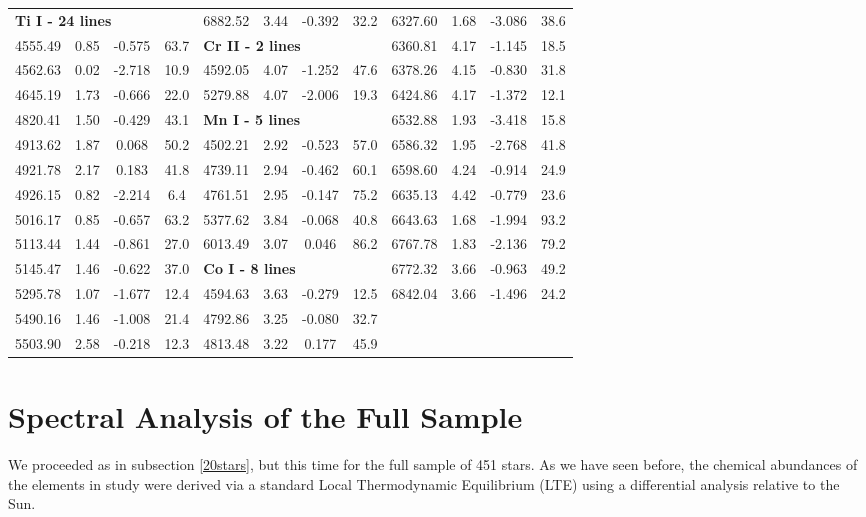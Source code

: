 \documentclass[dvips,12pt,a4paper]{report}
\begin{document}
{{\begin{table}[h!]
\begin{tabular}{c c c c | c c c c | c c c c}
\multicolumn{3}{l}{\textbf{Ti I - 24 lines}} & & 6882.52 & 3.44 & -0.392 &  32.2 & 6327.60 & 1.68 & -3.086 &  38.6 \\
4555.49 & 0.85 & -0.575 &  63.7 & \multicolumn{3}{l}{\textbf{Cr II - 2 lines}} &  & 6360.81 & 4.17 & -1.145 &  18.5 \\
4562.63 & 0.02 & -2.718 &  10.9 & 4592.05 & 4.07 & -1.252 &  47.6 & 6378.26 & 4.15 & -0.830 &  31.8 \\
4645.19 & 1.73 & -0.666 &  22.0 & 5279.88 & 4.07 & -2.006 &  19.3 & 6424.86 & 4.17 & -1.372 &  12.1 \\
4820.41 & 1.50 & -0.429 &  43.1 & \multicolumn{3}{l}{\textbf{Mn I - 5 lines}}  &  & 6532.88 & 1.93 & -3.418 &  15.8 \\
4913.62 & 1.87 &  0.068 &  50.2 & 4502.21 & 2.92 & -0.523 &  57.0 & 6586.32 & 1.95 & -2.768 &  41.8 \\
4921.78 & 2.17 &  0.183 &  41.8 & 4739.11 & 2.94 & -0.462 &  60.1 & 6598.60 & 4.24 & -0.914 &  24.9 \\
4926.15 & 0.82 & -2.214 &   6.4 & 4761.51 & 2.95 & -0.147 &  75.2 & 6635.13 & 4.42 & -0.779 &  23.6 \\
5016.17 & 0.85 & -0.657 &  63.2 & 5377.62 & 3.84 & -0.068 &  40.8 & 6643.63 & 1.68 & -1.994 &  93.2 \\
5113.44 & 1.44 & -0.861 &  27.0 & 6013.49 & 3.07 &  0.046 &  86.2 & 6767.78 & 1.83 & -2.136 &  79.2 \\
5145.47 & 1.46 & -0.622 &  37.0 & \multicolumn{3}{l}{\textbf{Co I - 8 lines}} &  & 6772.32 & 3.66 & -0.963 &  49.2 \\
5295.78 & 1.07 & -1.677 &  12.4 & 4594.63 & 3.63 & -0.279 &  12.5 & 6842.04 & 3.66 & -1.496 &  24.2 \\
5490.16 & 1.46 & -1.008 &  21.4 & 4792.86 & 3.25 & -0.080 &  32.7 \\ 
5503.90 & 2.58 & -0.218 &  12.3 & 4813.48 & 3.22 &  0.177 &  45.9 \\
\hline
\end{tabular}
\end {table}



\section {Spectral Analysis of the Full Sample}

We proceeded as in subsection \ref{20stars}, but this time for the full sample of 451 stars. As we have seen before, the chemical abundances of the elements in study were derived via a standard Local Thermodynamic Equilibrium (LTE) using a  differential analysis relative to the Sun. 

}}
\end{document}
